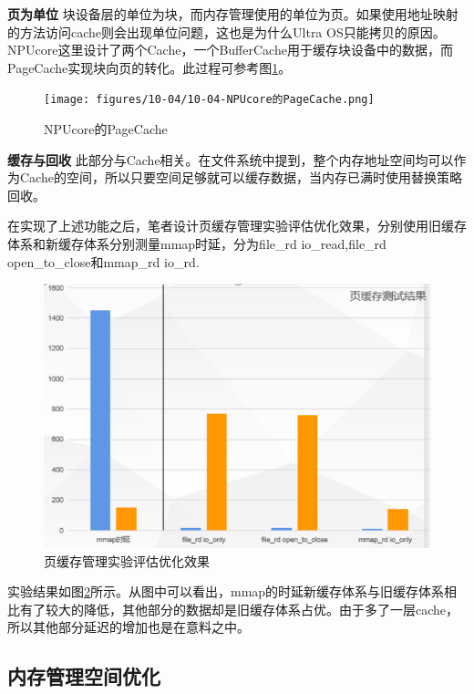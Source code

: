 \textbf{页为单位} \; 块设备层的单位为块，而内存管理使用的单位为页。如果使用地址映射的方法访问cache则会出现单位问题，这也是为什么Ultra OS只能拷贝的原因。NPUcore这里设计了两个Cache，一个BufferCache用于缓存块设备中的数据，而PageCache实现块向页的转化。此过程可参考图\ref{exam-8}。

\begin{figure}[htbp]
	\centering
	\texttt{[image: figures/10-04/10-04-NPUcore的PageCache.png]}
	\caption{NPUcore的PageCache}
	\label{exam-8}
\end{figure}

\textbf{缓存与回收} \; 此部分与Cache相关。在文件系统中提到，整个内存地址空间均可以作为Cache的空间，所以只要空间足够就可以缓存数据，当内存已满时使用替换策略回收。

在实现了上述功能之后，笔者设计页缓存管理实验评估优化效果，分别使用旧缓存体系和新缓存体系分别测量mmap时延，分为file\_rd io\_read,file\_rd open\_to\_close和mmap_rd io\_rd.

\begin{figure}[htbp]
	\centering
	\includegraphics[scale=0.5]{figures/10-04/10-04-页缓存管理实验评估优化效果.png}
	\caption{页缓存管理实验评估优化效果}
	\label{exam-9}
\end{figure}

实验结果如图\ref{exam-9}所示。从图中可以看出，mmap的时延新缓存体系与旧缓存体系相比有了较大的降低，其他部分的数据却是旧缓存体系占优。由于多了一层cache，所以其他部分延迟的增加也是在意料之中。

\subsection{内存管理空间优化}

